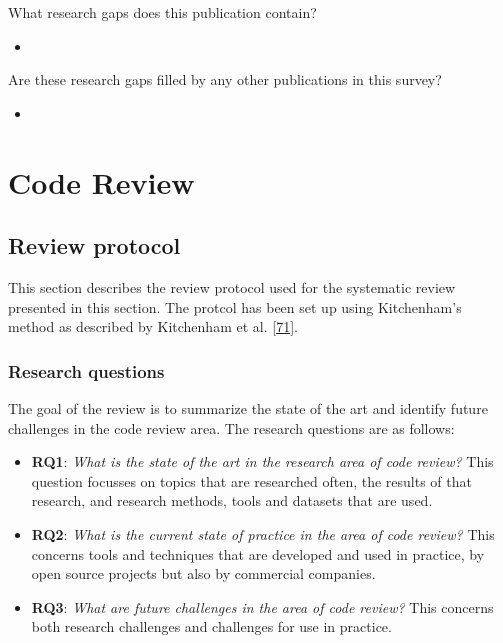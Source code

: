 \documentclass[]{book}
\providecommand{\tightlist}{%
  \setlength{\itemsep}{0pt}\setlength{\parskip}{0pt}}
\begin{document}
What research gaps does this publication contain?

\begin{itemize}
\item
\end{itemize}

Are these research gaps filled by any other publications in this survey?

\begin{itemize}
\item
\end{itemize}

\chapter{Code Review}\label{code-review}

\section{Review protocol}\label{review-protocol}

This section describes the review protocol used for the systematic
review presented in this section. The protcol has been set up using
Kitchenham's method as described by Kitchenham et al.
{[}\protect\hyperlink{ref-kitchenham2007}{71}{]}.

\subsection{Research questions}\label{research-questions-2}

The goal of the review is to summarize the state of the art and identify
future challenges in the code review area. The research questions are as
follows:

\begin{itemize}
\tightlist
\item
  \textbf{RQ1}: \emph{What is the state of the art in the research area
  of code review?} This question focusses on topics that are researched
  often, the results of that research, and research methods, tools and
  datasets that are used.
\item
  \textbf{RQ2}: \emph{What is the current state of practice in the area
  of code review?} This concerns tools and techniques that are developed
  and used in practice, by open source projects but also by commercial
  companies.
\item
  \textbf{RQ3}: \emph{What are future challenges in the area of code
  review?} This concerns both research challenges and challenges for use
  in practice.
\end{itemize}
\end{document}
